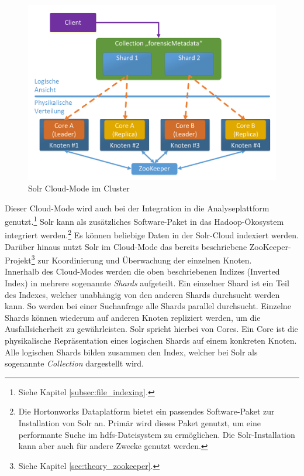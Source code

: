 \begin{figure}[ht]
  \centering
  \includegraphics[width=\textwidth]{./resource/solr_cluster_architecture.pdf}
  \caption{Solr Cloud-Mode im Cluster}
  \label{fig:solr_cluster_architecture}
\end{figure}

\noindent
Dieser Cloud-Mode wird auch bei der Integration in die Analyseplattform genutzt.\footnote{Siehe Kapitel \ref{subsec:file_indexing}.} Solr kann als zusätzliches Software-Paket in das Hadoop-Ökosystem integriert werden.\footnote{Die Hortonworks Dataplatform bietet ein passendes Software-Paket zur Installation von Solr an. Primär wird dieses Paket genutzt, um eine performante Suche im \gls{hdfs}-Dateisystem zu ermöglichen. Die Solr-Installation kann aber auch für andere Zwecke genutzt werden.} Es können beliebige Daten in der Solr-Cloud indexiert werden. 
Darüber hinaus nutzt Solr im Cloud-Mode das bereits beschriebene ZooKeeper-Projekt\footnote{Siehe Kapitel \ref{sec:theory_zookeeper}.} zur Koordinierung und Überwachung der einzelnen Knoten.\\
Innerhalb des Cloud-Modes werden die oben beschriebenen Indizes (Inverted Index) in mehrere sogenannte \textit{Shards} aufgeteilt. Ein einzelner Shard ist ein Teil des Indexes, welcher unabhängig von den anderen Shards durchsucht werden kann. So werden bei einer Suchanfrage alle Shards parallel durchsucht. Einzelne Shards können wiederum auf anderen Knoten repliziert werden, um die Ausfallsicherheit zu gewährleisten. Solr spricht hierbei von Cores. Ein Core ist die physikalische Repräsentation eines logischen Shards auf einem konkreten Knoten. Alle logischen Shards bilden zusammen den Index, welcher bei Solr als sogenannte \textit{Collection} dargestellt wird.\cite{solr_cloud_scaling}\\

